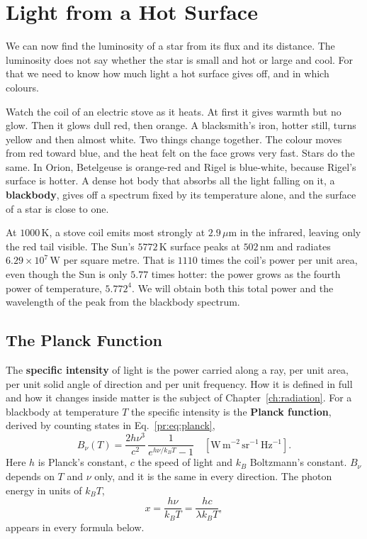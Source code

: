 \section{Light from a Hot Surface}
\label{ph:sec:blackbody}

We can now find the luminosity of a star from its flux and its distance. The luminosity does not say whether the star is small and hot or large and cool. For that we need to know how much light a hot surface gives off, and in which colours.

Watch the coil of an electric stove as it heats. At first it gives warmth but no glow. Then it glows dull red, then orange. A blacksmith's iron, hotter still, turns yellow and then almost white. Two things change together. The colour moves from red toward blue, and the heat felt on the face grows very fast. Stars do the same. In Orion, Betelgeuse is orange-red and Rigel is blue-white, because Rigel's surface is hotter. A dense hot body that absorbs all the light falling on it, a \textbf{blackbody}, gives off a spectrum fixed by its temperature alone, and the surface of a star is close to one.

At $1000\,\mathrm K$, a stove coil emits most strongly at $2.9\,\mu\mathrm m$ in the infrared, leaving only the red tail visible. The Sun's $5772\,\mathrm K$ surface peaks at $502\,\mathrm{nm}$ and radiates $6.29\times10^7\,\mathrm W$ per square metre. That is $1110$ times the coil's power per unit area, even though the Sun is only $5.77$ times hotter: the power grows as the fourth power of temperature, $5.772^4$. We will obtain both this total power and the wavelength of the peak from the blackbody spectrum.

\subsection{The Planck Function}

The \textbf{specific intensity} of light is the power carried along a ray, per unit area, per unit solid angle of direction and per unit frequency. How it is defined in full and how it changes inside matter is the subject of Chapter~\ref{ch:radiation}. For a blackbody at temperature $T$ the specific intensity is the \textbf{Planck function}, derived by counting states in Eq.~\eqref{pr:eq:planck},
\begin{equation}
	B_\nu(T) = \frac{2h\nu^3}{c^2}\, \frac{1}{e^{h\nu/k_BT} - 1}\quad \left[\mathrm{W\,m^{-2}\,sr^{-1}\,Hz^{-1}}\right].
	\label{eq:planck_frequency}
\end{equation}
Here $h$ is Planck's constant, $c$ the speed of light and $k_B$ Boltzmann's constant. $B_\nu$ depends on $T$ and $\nu$ only, and it is the same in every direction. The photon energy in units of $k_BT$,
\[
x=\frac{h\nu}{k_BT}=\frac{hc}{\lambda k_BT},
\]
appears in every formula below.

